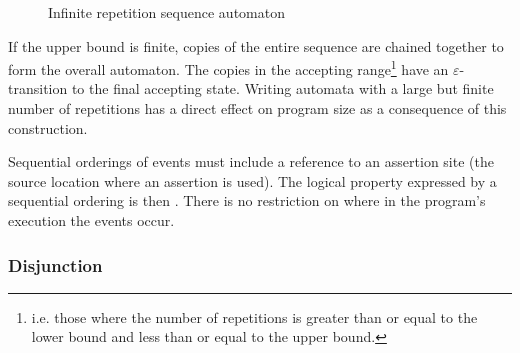 \begin{figure}
  \centering
  \caption{Infinite repetition sequence automaton}
  \label{fig:seq-inf-auto}
\end{figure}

If the upper bound is finite, copies of the entire sequence are chained together
to form the overall automaton. The copies in the accepting range\footnote{i.e.
those where the number of repetitions is greater than or equal to the lower
bound and less than or equal to the upper bound.} have an
$\varepsilon$-transition to the final accepting state. Writing automata with a
large but finite number of repetitions has a direct effect on program size as a
consequence of this construction.

Sequential orderings of events must include a reference to an assertion site
(the source location where an assertion is used). The logical property expressed
by a sequential ordering is then . There is no restriction on where in the program's execution the events
occur.

\subsubsection{Disjunction}

